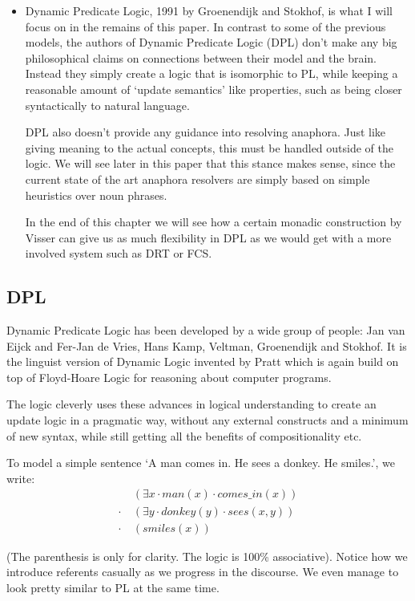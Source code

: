 \documentclass[12pt]{article}
\begin{document}
\begin{itemize}
\item Dynamic Predicate Logic, 1991 by Groenendijk and Stokhof\cite{groenendijk1991dynamic}, is what I will focus on in the remains of this paper. In contrast to some of the previous models, the authors of Dynamic Predicate Logic (DPL) don't make any big philosophical claims on connections between their model and the brain. Instead they simply create a logic that is isomorphic to PL, while keeping a reasonable amount of `update semantics' like properties, such as being closer syntactically to natural language.

DPL also doesn't provide any guidance into resolving anaphora. Just like giving meaning to the actual concepts, this must be handled outside of the logic. We will see later in this paper that this stance makes sense, since the current state of the art anaphora resolvers are simply based on simple heuristics over noun phrases.

In the end of this chapter we will see how a certain monadic construction by Visser can give us as much flexibility in DPL as we would get with a more involved system such as DRT or FCS.
\end{itemize}

\subsection{DPL}

Dynamic Predicate Logic has been developed by a wide group of people: Jan van Eijck and Fer-Jan de Vries\cite{eijck1992dynamic}, Hans Kamp, Veltman, Groenendijk and Stokhof. It is the linguist version of Dynamic Logic invented by Pratt\cite{pratt1976semantical} which is again build on top of Floyd-Hoare Logic for reasoning about computer programs.

The logic cleverly uses these advances in logical understanding to create an update logic in a pragmatic way, without any external constructs and a minimum of new syntax, while still getting all the benefits of compositionality etc.

To model a simple sentence `A man comes in. He sees a donkey. He smiles.', we write:
%
\begin{align}
&(\exists x \cdot man(x) \cdot comes\_in(x)) \nonumber\\
\cdot\ &(\exists y \cdot donkey(y) \cdot sees(x,y)) \nonumber\\
\cdot\ &(smiles(x)) \nonumber
\end{align}

(The parenthesis is only for clarity. The logic is 100\% associative). Notice how we introduce referents casually as we progress in the discourse. We even manage to look pretty similar to PL at the same time. 
\end{document}

